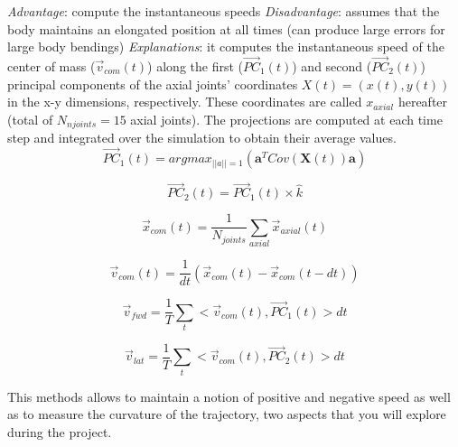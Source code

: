 \documentclass{cmc}
\begin{document}
\begin{enumerate}
\begin{itemize}
\begin{enumerate}
	\textit{Advantage}: compute the instantaneous speeds \newline
	\textit{Disadvantage}: assumes that the body maintains an elongated position at all times (can produce large errors for large body bendings) \newline
	\textit{Explanations}: it computes the instantaneous speed of the center of mass ($\vec{v}_{com}(t)$) along the first ($\vec{PC}_1(t)$) and second ($\vec{PC}_2(t)$) principal components of the axial joints' coordinates $X(t)=(x(t),y(t))$ in the x-y dimensions, respectively. These coordinates are called $x_{axial}$ hereafter (total of $N_{njoints}=15$ axial joints). The projections are computed at each time step and integrated over the simulation to obtain their average values.
	\begin{equation}
	  \label{eq:pca1}
	    \vec{PC}_1(t) = argmax_{||a||=1}(\boldsymbol{a}^T Cov(\boldsymbol{X}(t)) \boldsymbol{a})
	\end{equation}

\begin{equation}
  \label{eq:pca2}
  \vec{PC}_2(t) = \vec{PC}_1(t) \times \hat{k}
\end{equation}

\begin{equation}
  \label{eq:xcom}
  \vec{x}_{com}(t) = \frac{1}{N_{joints}} \sum_{axial} \vec{x}_{axial}(t)
\end{equation}


\begin{equation}
  \label{eq:vcom}
  \vec{v}_{com}(t) = \frac{1}{dt} (\vec{x}_{com}(t) - \vec{x}_{com}(t-dt))
\end{equation}

\begin{equation}
  \label{eq:vfwd}
  \vec{v}_{fwd} = \frac{1}{T} \sum_t < \vec{v}_{com}(t), \vec{PC}_1(t) > dt
\end{equation}

\begin{equation}
  \label{eq:vlat}
  \vec{v}_{lat} = \frac{1}{T} \sum_t < \vec{v}_{com}(t), \vec{PC}_2(t) > dt
\end{equation}

This methods allows to maintain a notion of positive and negative speed as well as to measure
the curvature of the trajectory, two aspects that you will explore during the project.


\end{enumerate}
\end{itemize}
\end{enumerate}
\end{document}
